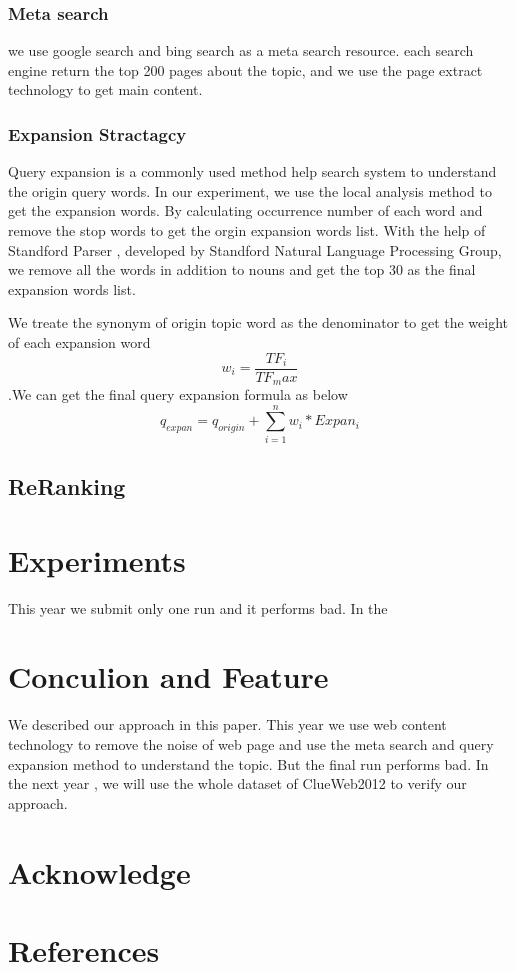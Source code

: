 \documentclass[runningheads,a4paper]{llncs}
\begin{document}
\subsubsection{Meta search}

we use google search and bing search as a meta search resource. each search engine return the top 200 pages about the topic, and we use the page extract technology \cite{linshuang-block} to get main content.  

\subsubsection{Expansion Stractagcy}
Query expansion is a commonly used method help search system to understand the origin query words. In our experiment, we use the local analysis \cite{localanalysis} method to get the expansion words. By calculating occurrence number of each word and remove the stop words to get the orgin expansion words list. With the help of Standford Parser \cite{standfordparser} , developed by Standford Natural Language Processing Group, we remove all the words in addition to nouns and get the top 30 as the final expansion words list.

We treate the synonym of origin topic word as the denominator to get the weight of each expansion word
\begin{equation}
w_i = \frac{TF_i}{TF_max}
\end{equation}
.We can get the final query expansion formula as below
\begin{equation}
q_{expan} = q_{origin} + \sum_{i=1}^n w_i * Expan_i
\end{equation}
\subsection{ReRanking}



\section{Experiments}

This year we submit only one run and it performs bad. In the 

\section{Conculion and Feature}

We described our approach in this paper. This year we use web content technology to remove the noise of web page and use the meta search and query expansion method to understand the topic. But the final run performs bad. In the next year , we will use the whole dataset of ClueWeb2012 to verify our approach.

\section{Acknowledge}

\section{References}
\end{document}
